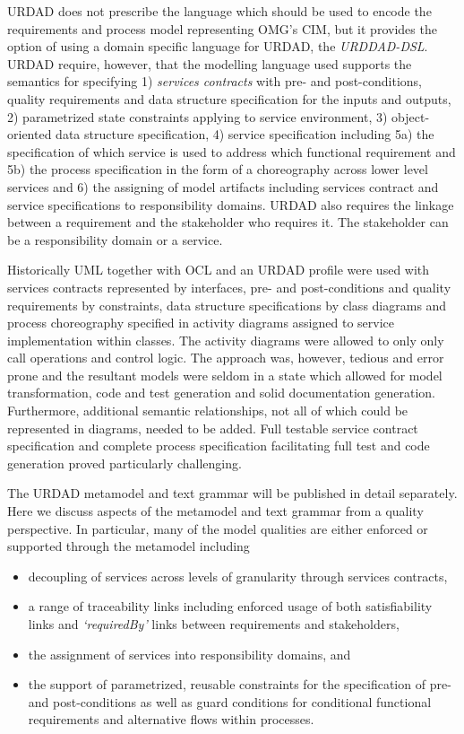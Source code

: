 URDAD does not prescribe the language which should be used to encode the requirements and process model representing OMG's CIM, but it provides the option of using a domain specific language for URDAD, the \emph{URDDAD-DSL}. URDAD require, however, that the modelling language used supports the semantics for specifying 1) \emph{services contracts} with pre- and post-conditions, quality requirements and data structure specification for the inputs and outputs, 2) parametrized state constraints applying to service environment, 3) object-oriented data structure specification, 4) service specification including 5a) the specification of which service is used to address which functional requirement and 5b) the process specification in the form of a choreography across lower level services and 6) the assigning of model artifacts including services contract and service specifications to responsibility domains. URDAD also requires the linkage between a requirement and the stakeholder who requires it. The stakeholder can be a responsibility domain or a service.

Historically UML together with OCL and an URDAD profile were used with services contracts represented by interfaces, pre- and post-conditions and quality requirements by constraints, data structure specifications by class diagrams and process choreography specified in activity diagrams assigned to service implementation within classes. The activity diagrams were allowed to only only call operations and control logic. The approach was, however, tedious and error prone and the resultant models were seldom in a state which allowed for model transformation, code and test generation and solid documentation generation. Furthermore, additional semantic relationships, not all of which could be represented in diagrams, needed to be added. Full testable service contract specification and complete process specification facilitating full test and code generation proved particularly challenging.


The URDAD metamodel and text grammar will be published in detail separately. Here we discuss aspects of the metamodel and text grammar from a quality perspective. In particular, many of the model qualities are either enforced or supported through the metamodel including
\begin{itemize}
 \item decoupling of services across levels of granularity through services contracts,
 \item a range of traceability links including enforced usage of both satisfiability links and \emph{`requiredBy'} links between requirements and stakeholders,
 \item the assignment of services into responsibility domains, and 
 \item the support of parametrized, reusable constraints for the specification of pre- and post-conditions as well as guard conditions for conditional functional requirements and alternative flows within processes.
\end{itemize}

